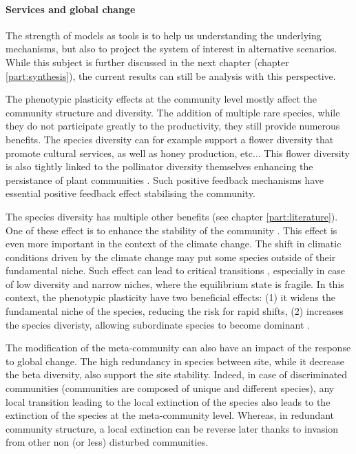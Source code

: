 \paragraph{Services and global change}

The strength of models as tools is to help us understanding the underlying mechanisms, but also to project the system of interest in alternative scenarios. While this subject is further discussed in the next chapter (chapter \ref{part:synthesis}), the current results can still be analysis with this perspective.

The phenotypic plasticity effects at the community level mostly affect the community structure and diversity. The addition of multiple rare species, while they do not participate greatly to the productivity, they still provide numerous benefits. The species diversity can for example support a flower diversity that promote cultural services, as well as honey production, etc... This flower diversity is also tightly linked to the pollinator diversity \parencite{frund_pollinator_2010} themselves enhancing the persistance of plant communities \parencite{fontaine_functional_2005}. Such positive feedback mechanisms have essential positive feedback effect stabilising the community. 

The species diversity has multiple other benefits (see chapter \ref{part:literature})\parencite{tilman_diversity_2001}. One of these effect is to enhance the stability of the community \parencite{morin_temporal_2014}. This effect is even more important in the context of the climate change. The shift in climatic conditions driven by the climate change may put some species outside of their fundamental niche. Such effect can lead to critical transitions \parencite{scheffer_catastrophic_2001}, especially in case of low diversity and narrow niches, where the equilibrium state is fragile. In this context, the phenotypic plasticity have two beneficial effects: (1) it widens the fundamental niche of the species, reducing the risk for rapid shifts, (2) increases the species diveristy, allowing subordinate species to become dominant \parencite{adler_climate_2006}.

The modification of the meta-community can also have an impact of the response to global change. The high redundancy in species between site, while it decrease the beta diversity, also support the site stability. Indeed, in case of discriminated communities (communities are composed of unique and different species), any local transition leading to the local extinction of the species also leads to the extinction of the species at the meta-community level. Whereas, in redundant community structure, a local extinction can be reverse later thanks to invasion from other non (or less) disturbed communities.

